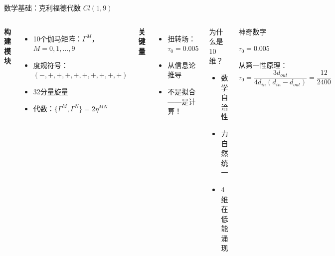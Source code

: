 \documentclass[aspectratio=169]{beamer}
\begin{document}
\begin{frame}{数学基础：克利福德代数 $Cl(1,9)$}
\begin{columns}
\textbf{构建模块}
\begin{itemize}
    \item 10个伽马矩阵：$\Gamma^M$，$M = 0,1,\ldots,9$
    \item 度规符号：$(-,+,+,+,+,+,+,+,+,+)$
    \item 32分量旋量
    \item 代数：$\{\Gamma^M, \Gamma^N\} = 2\eta^{MN}$
\end{itemize}

\vspace{0.5cm}

\textbf{关键量}
\begin{itemize}
    \item 扭转场：$\tau_0 = 0.005$
    \item 从信息论推导
    \item 不是拟合——是计算！
\end{itemize}

\begin{block}{为什么是10维？}
\begin{itemize}
    \item 数学自洽性
    \item 力自然统一
    \item 4维在低能涌现
\end{itemize}
\end{block}

\begin{alertblock}{神奇数字}
\begin{center}
\Large
$\tau_0 = 0.005$
\end{center}
从第一性原理：
\[
\tau_0 = \frac{3d_{out}}{4d_{in}(d_{in}-d_{out})} = \frac{12}{2400}
\]
\end{alertblock}
\end{columns}
\end{frame}
\end{document}
